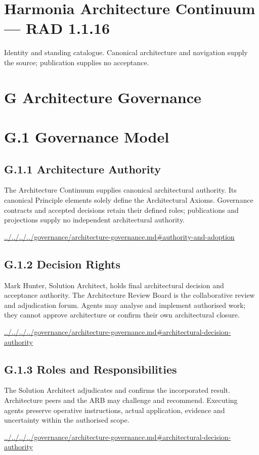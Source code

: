 \documentclass[10pt,a4paper]{article}
\begin{document}
\section*{Harmonia Architecture Continuum — RAD 1.1.16}
Identity and standing catalogue. Canonical architecture and navigation supply the source; publication supplies no acceptance.\par
\section*{G Architecture Governance}
\section*{G.1 Governance Model}
\subsection*{G.1.1 Architecture Authority}
The Architecture Continuum supplies canonical architectural authority. Its canonical Principle elements solely define the Architectural Axioms. Governance contracts and accepted decisions retain their defined roles; publications and projections supply no independent architectural authority.\par
{\footnotesize\url{../../../../governance/architecture-governance.md#authority-and-adoption}}\par
\subsection*{G.1.2 Decision Rights}
Mark Hunter, Solution Architect, holds final architectural decision and acceptance authority. The Architecture Review Board is the collaborative review and adjudication forum. Agents may analyse and implement authorised work; they cannot approve architecture or confirm their own architectural closure.\par
{\footnotesize\url{../../../../governance/architecture-governance.md#architectural-decision-authority}}\par
\subsection*{G.1.3 Roles and Responsibilities}
The Solution Architect adjudicates and confirms the incorporated result. Architecture peers and the ARB may challenge and recommend. Executing agents preserve operative instructions, actual application, evidence and uncertainty within the authorised scope.\par
{\footnotesize\url{../../../../governance/architecture-governance.md#architectural-decision-authority}}\par
\end{document}

